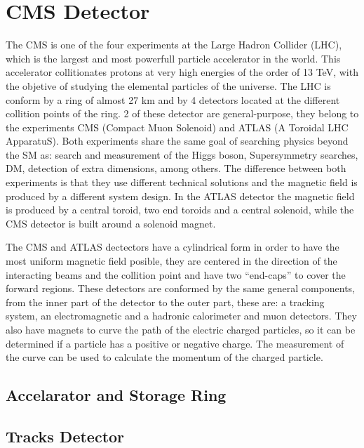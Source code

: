 \chapter{CMS Detector}

The CMS is one of the four experiments at the Large Hadron Collider (LHC), which is the largest and most powerfull particle accelerator in the world. This accelerator collitionates protons at very high energies of the order of 13 TeV, with the objetive of studying the elemental particles of the universe. 
The LHC is conform by a ring of almost 27 km and by 4 detectors located at the different collition points of the ring. 2 of these detector are general-purpose, they belong to the experiments CMS (Compact Muon Solenoid) and ATLAS (A Toroidal LHC ApparatuS). Both experiments share the same goal of searching physics beyond the SM as: search and measurement of the Higgs boson, Supersymmetry searches, DM, detection of extra dimensions, among others. The difference between both experiments is that they use different technical solutions and the magnetic field is produced by a different system design. In the ATLAS detector the magnetic field is produced by a central toroid, two end toroids and a central solenoid, while the CMS detector is built around a solenoid magnet.  

The CMS and ATLAS dectectors have a cylindrical form in order to have the most uniform magnetic field posible, they are centered in the direction of the interacting beams and the collition point and have two ``end-caps'' to cover the forward regions. These detectors are conformed by the same general components, from the inner part of the detector to the outer part, these are: a tracking system, an electromagnetic and a hadronic calorimeter and muon detectors. They also have magnets to curve the path of the electric charged particles, so it can be determined if a particle has a positive or negative charge. The measurement of the curve can be used to calculate the momentum of the charged particle.

\section{Accelarator and Storage Ring}


\section{Tracks Detector}

